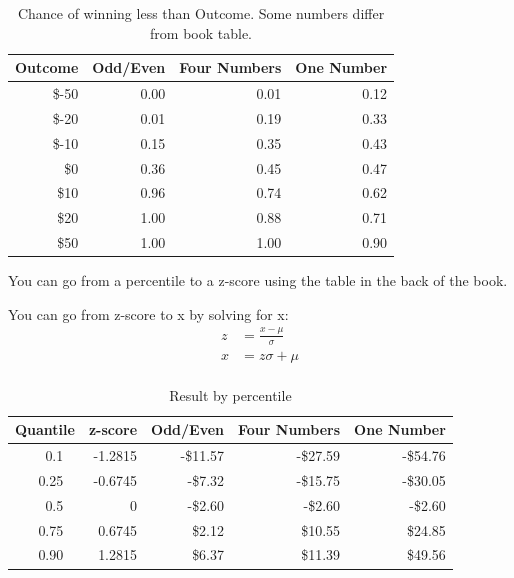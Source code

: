 \documentclass[landscape]{exam}
\begin{document}
  \begin{table}
    \centering
    \begin{tabular}[H]{rrrr}
      \toprule
      Outcome & Odd/Even & Four Numbers & One Number \\
      \midrule
      \$-50   & 0.00     & 0.01         & 0.12 \\
      \$-20   & 0.01     & 0.19         & 0.33 \\
      \$-10   & 0.15     & 0.35         & 0.43 \\
      \$0     & 0.36     & 0.45         & 0.47  \\
      \$10    & 0.96     & 0.74         & 0.62 \\
      \$20    & 1.00     & 0.88         & 0.71 \\
      \$50    & 1.00     & 1.00         & 0.90 \\
      \bottomrule
    \end{tabular}
    \caption{Chance of winning less than Outcome. Some numbers differ
    from book table.}\label{tab:percentages}
  \end{table}

  You can go from a percentile to a z-score using the table in the back of the
  book.

  You can go from z-score to x by solving for x:
  \begin{align*}
    z &= \frac{x - \mu}{\sigma} \\
    x &= z \sigma + \mu \\
  \end{align*}

  \begin{table}
    \centering
    \begin{tabular}[H]{rrrrr}
      \toprule
      Quantile & z-score & Odd/Even & Four Numbers & One Number \\
      \midrule
      0.1 \    & -1.2815 & -\$11.57 & -\$27.59     & -\$54.76 \\
      0.25 \   & -0.6745 & -\$7.32  & -\$15.75     & -\$30.05 \\
      0.5 \    & 0       & -\$2.60  & -\$2.60      & -\$2.60 \\
      0.75 \   & 0.6745  & \$2.12   & \$10.55      & \$24.85 \\
      0.90 \   & 1.2815  & \$6.37   & \$11.39      & \$49.56 \\
      \bottomrule
    \end{tabular}
    \caption{Result by percentile}\label{tab:quantiles}
  \end{table}
  
\end{document}
